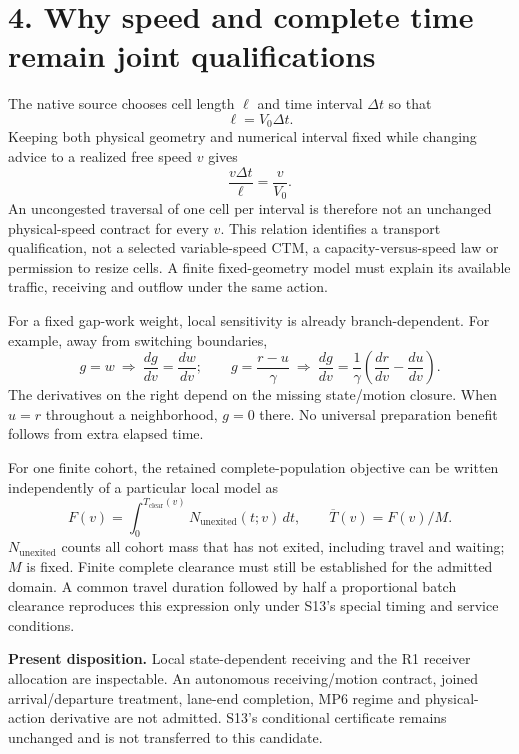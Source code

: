 \documentclass[11pt,a4paper]{article}
\begin{document}
\newpage
\section*{4. Why speed and complete time remain joint qualifications}
The native source chooses cell length $\ell$ and time interval $\Delta t$ so
that
\[
 \ell=V_0\Delta t.
\]
Keeping both physical geometry and numerical interval fixed while changing
advice to a realized free speed $v$ gives
\[
 \frac{v\Delta t}{\ell}=\frac{v}{V_0}.
\]
An uncongested traversal of one cell per interval is therefore not an unchanged
physical-speed contract for every $v$. This relation identifies a transport
qualification, not a selected variable-speed CTM, a capacity-versus-speed law
or permission to resize cells. A finite fixed-geometry model must explain
its available traffic, receiving and outflow under the same action.

For a fixed gap-work weight, local sensitivity is already branch-dependent.
For example, away from switching boundaries,
\[
 g=w\ \Longrightarrow\ \frac{dg}{dv}=\frac{dw}{dv};\qquad
 g=\frac{r-u}{\gamma}\ \Longrightarrow\
 \frac{dg}{dv}=\frac1\gamma\left(\frac{dr}{dv}-\frac{du}{dv}\right).
\]
The derivatives on the right depend on the missing state/motion closure.
When $u=r$ throughout a neighborhood, $g=0$ there. No universal preparation
benefit follows from extra elapsed time.

For one finite cohort, the retained complete-population objective can be
written independently of a particular local model as
\[
 F(v)=\int_0^{T_{\mathrm{clear}}(v)} N_{\mathrm{unexited}}(t;v)\,dt,
 \qquad \overline T(v)=F(v)/M.
\]
$N_{\mathrm{unexited}}$ counts all cohort mass that has not exited, including
travel and waiting; $M$ is fixed. Finite complete clearance must still be
established for the admitted domain. A common travel duration followed by
half a proportional batch clearance reproduces this expression only under
S13's special timing and service conditions.

\textbf{Present disposition.} Local state-dependent receiving and the R1
receiver allocation are inspectable. An autonomous receiving/motion contract,
joined arrival/departure treatment, lane-end completion, MP6 regime and
physical-action derivative are not admitted. S13's conditional certificate
remains unchanged and is not transferred to this candidate.
\end{document}
